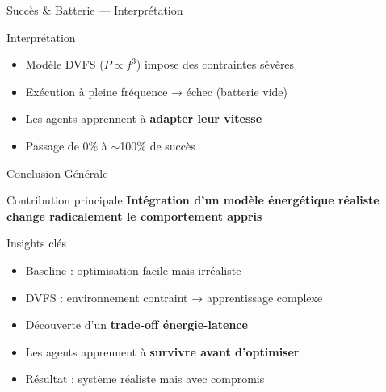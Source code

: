 \documentclass[10pt,aspectratio=169]{beamer}
\begin{document}
\begin{frame}{Succès \& Batterie — Interprétation}

\begin{block}{Interprétation}
\begin{itemize}
    \item Modèle DVFS ($P \propto f^3$) impose des contraintes sévères
    \item Exécution à pleine fréquence → échec (batterie vide)
    \item Les agents apprennent à \textbf{adapter leur vitesse}
    \item Passage de 0\% à $\sim$100\% de succès
\end{itemize}
\end{block}

\end{frame}

\begin{frame}{Conclusion Générale}

\begin{alertblock}{Contribution principale}
\centering
\textbf{Intégration d’un modèle énergétique réaliste change radicalement le comportement appris}
\end{alertblock}

\vspace{0.3cm}

\begin{block}{Insights clés}
\begin{itemize}
    \item Baseline : optimisation facile mais irréaliste
    \item DVFS : environnement contraint → apprentissage complexe
    \item Découverte d’un \textbf{trade-off énergie-latence}
    \item Les agents apprennent à \textbf{survivre avant d’optimiser}
    \item Résultat : système réaliste mais avec compromis
\end{itemize}
\end{block}

\end{frame}
\end{document}
